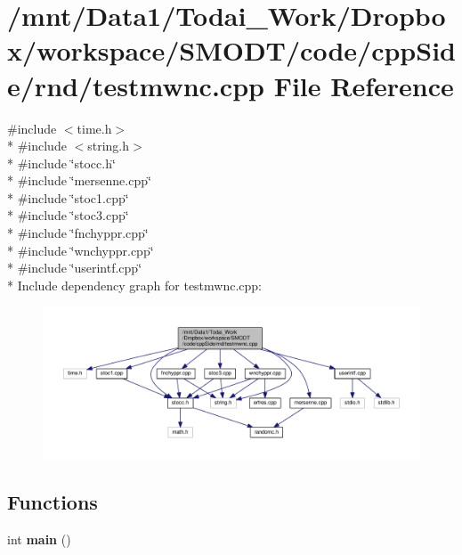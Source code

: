\section{/mnt/\-Data1/\-Todai\-\_\-\-Work/\-Dropbox/workspace/\-S\-M\-O\-D\-T/code/cpp\-Side/rnd/testmwnc.cpp File Reference}
\label{rnd_2testmwnc_8cpp}
{\ttfamily \#include $<$time.\-h$>$}\\*
{\ttfamily \#include $<$string.\-h$>$}\\*
{\ttfamily \#include \char`\"{}stocc.\-h\char`\"{}}\\*
{\ttfamily \#include \char`\"{}mersenne.\-cpp\char`\"{}}\\*
{\ttfamily \#include \char`\"{}stoc1.\-cpp\char`\"{}}\\*
{\ttfamily \#include \char`\"{}stoc3.\-cpp\char`\"{}}\\*
{\ttfamily \#include \char`\"{}fnchyppr.\-cpp\char`\"{}}\\*
{\ttfamily \#include \char`\"{}wnchyppr.\-cpp\char`\"{}}\\*
{\ttfamily \#include \char`\"{}userintf.\-cpp\char`\"{}}\\*
Include dependency graph for testmwnc.\-cpp\-:\nopagebreak
\begin{figure}[H]
\begin{center}
\leavevmode
\includegraphics[width=350pt]{rnd_2testmwnc_8cpp__incl}
\end{center}
\end{figure}
\subsection*{Functions}
\begin{DoxyCompactItemize}
\item 
int {\bf main} ()
\end{DoxyCompactItemize}
